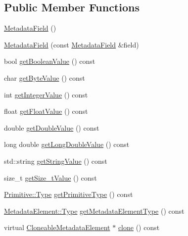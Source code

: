 \subsection*{Public Member Functions}
\begin{DoxyCompactItemize}
\item 
\hyperlink{classBUSBOY_1_1MetadataField_a3bb29a5002fca022980a43139255d294}{MetadataField} ()
\item 
\hyperlink{classBUSBOY_1_1MetadataField_ac1fdbfa0b54847131113f9eac111c920}{MetadataField} (const \hyperlink{classBUSBOY_1_1MetadataField}{MetadataField} \&field)
\item 
bool \hyperlink{classBUSBOY_1_1MetadataField_aeb52f212ef6e36117fef62ecb9c5bd94}{getBooleanValue} () const 
\item 
char \hyperlink{classBUSBOY_1_1MetadataField_ace7ae36d7fdea2aa66383c3f515e5454}{getByteValue} () const 
\item 
int \hyperlink{classBUSBOY_1_1MetadataField_a9fdad3d95271341413500376c3ac29fb}{getIntegerValue} () const 
\item 
float \hyperlink{classBUSBOY_1_1MetadataField_abefb39efc356cbf184aae0cc0499866b}{getFloatValue} () const 
\item 
double \hyperlink{classBUSBOY_1_1MetadataField_a2c90aded9e1f95a48af48b487c77409a}{getDoubleValue} () const 
\item 
long double \hyperlink{classBUSBOY_1_1MetadataField_a3838785ed25561d7ff7e1f750972e486}{getLongDoubleValue} () const 
\item 
std::string \hyperlink{classBUSBOY_1_1MetadataField_aef00689ec315d36563245366a8e9df59}{getStringValue} () const 
\item 
size\_\-t \hyperlink{classBUSBOY_1_1MetadataField_ad8e4e7696464a6b043a2041678227482}{getSize\_\-tValue} () const 
\item 
\hyperlink{classBUSBOY_1_1Primitive_afa08dc3cc68d2e851adafb0fc492cf15}{Primitive::Type} \hyperlink{classBUSBOY_1_1MetadataField_a6adf53e6993afff4870b23e690f48c60}{getPrimitiveType} () const 
\item 
\hyperlink{classBUSBOY_1_1MetadataElement_ab66bf575c7d26f857a2871d42bd97d12}{MetadataElement::Type} \hyperlink{classBUSBOY_1_1MetadataField_abfa4376d1d8cec6e7c0cef293276a33a}{getMetadataElementType} () const 
\item 
virtual \hyperlink{classBUSBOY_1_1CloneableMetadataElement}{CloneableMetadataElement} $\ast$ \hyperlink{classBUSBOY_1_1MetadataField_a2a33bad240cf8237ce9fd5c2b8fc38f8}{clone} () const 
\item 

\end{DoxyCompactItemize}
